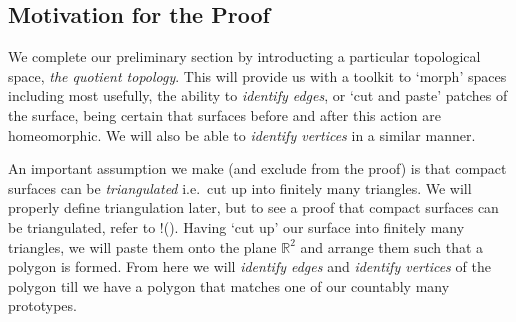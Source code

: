 \subsection{Motivation for the Proof}
\label{sec:intro:motivation}

We complete our preliminary section by introducting a particular
topological space, \emph{the quotient topology}. This will provide us
with a toolkit to `morph' spaces including most usefully, the
ability to \emph{identify edges}, or  `cut and paste' patches of the
surface, being certain that surfaces before and after this action are
homeomorphic. We will also be able to \emph{identify vertices} in a similar
manner.

An important assumption we make (and exclude from the proof) is that
compact surfaces can be \emph{triangulated} i.e.\ cut up into finitely
many triangles. We will properly define triangulation later, but to
see a proof that compact surfaces can be triangulated, refer to
!(). Having `cut up' our surface into finitely many triangles, we will
paste them onto the plane $\mathbb{R}^2$ and arrange them such that a
polygon is formed. From here we will \emph{identify edges} and
\emph{identify vertices} of the polygon till we have a polygon that
matches one of our countably many prototypes.




